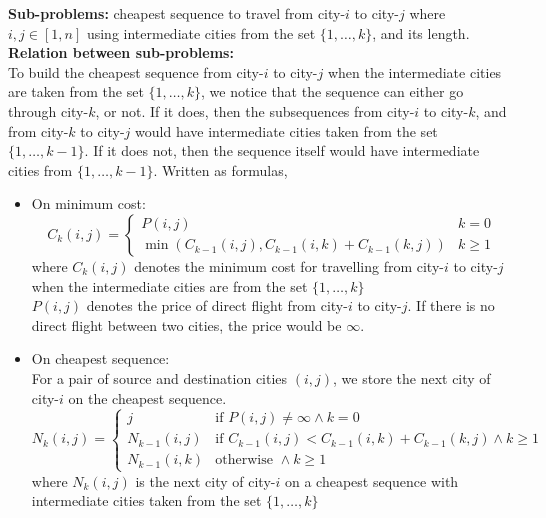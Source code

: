 \documentclass[12pt]{article}
\begin{document}
\pagebreak
\noindent\textbf{Sub-problems:} cheapest sequence to travel from city-\(i\) to city-\(j\) where \(i,j \in [1,n]\) using intermediate cities from the set \(\{1, \hdots, k\}\), and its length.\\
\textbf{Relation between sub-problems:}\\
 To build the cheapest sequence from city-\(i\) to city-\(j\) when the intermediate cities are taken from the set \(\{1, \hdots, k\}\), we notice that the sequence can either go through city-\(k\), or not. If it does, then the subsequences from city-\(i\) to city-\(k\), and from city-\(k\) to city-\(j\) would have intermediate cities taken from the set \(\{1, \hdots, k-1\}\). If it does not, then the sequence itself would have intermediate cities from \(\{1, \hdots, k-1\}\). Written as formulas,
\begin{itemize}
     \item On minimum cost:
     \begin{equation*}
          C_k (i,j) =
          \begin{cases}
               P(i, j) & k=0 \\
               \min (C_{k-1} (i, j), C_{k-1} (i, k) + C_{k-1} (k, j)) & k \geq 1
          \end{cases}
     \end{equation*}
     where \(C_k (i,j)\) denotes the minimum cost for travelling from city-\(i\) to city-\(j\) when the intermediate cities are from the set \(\{1, \hdots, k\}\)\\
     \(P(i,j)\) denotes the price of direct flight from city-\(i\) to city-\(j\). If there is no direct flight between two cities, the price would be \(\infty\).
     \item On cheapest sequence:\\
     For a pair of source and destination cities \((i, j)\), we store the next city of city-\(i\) on the cheapest sequence.
     \begin{equation*}
          N_k{(i,j)} =
          \begin{cases}
               j & \text{if } P(i, j) \neq \infty \land k=0\\
               N_{k-1} (i,j) & \text{if } C_{k-1} (i, j) < C_{k-1} (i, k) + C_{k-1} (k, j) \land k \geq 1 \\
               N_{k-1} (i,k) & \text{otherwise } \land k \geq 1
          \end{cases}
     \end{equation*}
     where \(N_k{(i,j)}\) is the next city of city-\(i\) on a cheapest sequence with intermediate cities taken from the set \(\{1, \hdots, k\}\)
\end{itemize}
\end{document}
